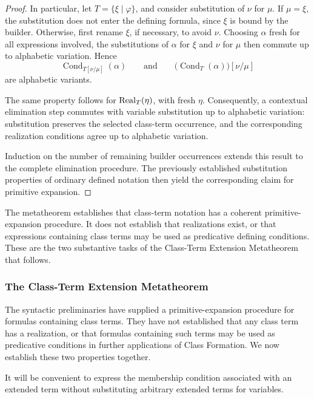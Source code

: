 \begin{proof}
In particular, let \(T=\{\xi\mid\varphi\}\), and consider
substitution of \(\nu\) for \(\mu\). If \(\mu=\xi\), the
substitution does not enter the defining formula, since
\(\xi\) is bound by the builder. Otherwise, first rename
\(\xi\), if necessary, to avoid \(\nu\). Choosing
\(\alpha\) fresh for all expressions involved, the
substitutions of \(\alpha\) for \(\xi\) and \(\nu\) for
\(\mu\) then commute up to alphabetic variation. Hence
\[
\operatorname{Cond}_{T[\nu/\mu]}(\alpha)
 \qquad \text{and} \qquad
\bigl(\operatorname{Cond}_T(\alpha)\bigr)[\nu/\mu]
\]
are alphabetic variants.

The same property follows for \(\operatorname{Real}_T(\eta)\), with
fresh \(\eta\). Consequently, a contextual elimination
step commutes with variable substitution up to alphabetic
variation: substitution preserves the selected class-term
occurrence, and the corresponding realization conditions
agree up to alphabetic variation.

Induction on the number of remaining builder occurrences
extends this result to the complete elimination procedure.
The previously established substitution properties of
ordinary defined notation then yield the corresponding
claim for primitive expansion.
\end{proof}

The metatheorem establishes that class-term notation has a coherent
primitive-expansion procedure. It does not establish that realizations
exist, or that expressions containing class terms may be used as
predicative defining conditions. These are the two substantive tasks
of the Class-Term Extension Metatheorem that follows.




\subsubsection{The Class-Term Extension Metatheorem}
\label{sec:class-term-extension-metatheorem}


The syntactic preliminaries have supplied a primitive-expansion procedure
for formulas containing class terms. They have not established that any
class term has a realization, or that formulas containing such terms may
be used as predicative conditions in further applications of Class
Formation. We now establish these two properties together.

It will be convenient to express the membership condition associated
with an extended term without substituting arbitrary extended terms
for variables.

